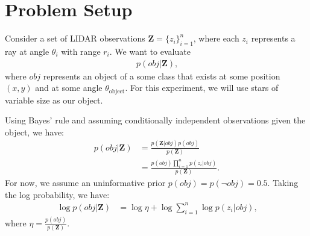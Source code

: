 \section{Problem Setup}

Consider a set of LIDAR observations $\mathbf{Z} = \{ z_i \}_{i=1}^n$, where
each $z_i$ represents a ray at angle $\theta_i$ with range $r_i$. We
want to evaluate
%
\begin{align}
  p( obj | \mathbf{Z} )
  \text{,}
\end{align}
%
where $obj$ represents an object of a some class that exists at some position $(x,
y)$ and at some angle $\theta_{\text{object}}$. For this experiment, we will use
stars of variable size as our object.

Using Bayes' rule and assuming conditionally independent observations given the
object, we have:
%
\begin{align}
  p( obj | \mathbf{Z} ) &= \frac{p(\mathbf{Z} | obj) p(obj)}{p(\mathbf{Z})} \\
    &= \frac{p(obj) \prod_{i=1}^{n} { p( z_i | obj) }} {p(\mathbf{Z})}
  \text{.}
\end{align}
%
For now, we assume an uninformative prior $p(obj) = p(\lnot obj) = 0.5$. Taking
the log probability, we have:
%
\begin{align}
  \log p( obj | \mathbf{Z} ) &= \log{\eta} + \log\sum_{i=1}^{n} { \log p( z_i | obj) }
  \text{,}
  \label{eq:obj_model}
\end{align}
%
where $\eta = \frac{p(obj)}{p(\mathbf{Z})}$.
